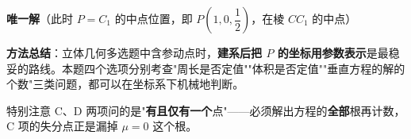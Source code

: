 \begin{answer}
\textbf{唯一解}（此时 $P=C_1$ 的中点位置，即 $P\left(1,0,\dfrac12\right)$，在棱 $CC_1$ 的中点）

\begin{gktip}
\textbf{方法总结}：立体几何多选题中含参动点时，\textbf{建系后把 $P$ 的坐标用参数表示}是最稳妥的路线。本题四个选项分别考查"周长是否定值""体积是否定值""垂直方程的解的个数"三类问题，都可以在坐标系下机械地判断。

特别注意 C、D 两项问的是"\textbf{有且仅有一个}点"——必须解出方程的\textbf{全部}根再计数，C 项的失分点正是漏掉 $\mu=0$ 这个根。
\end{gktip}


\par\medskip

\end{answer}

